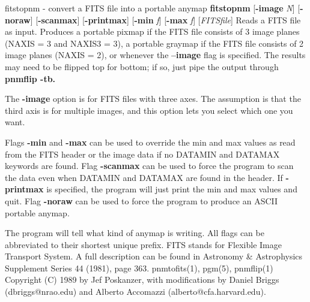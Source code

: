 fitstopnm - convert a FITS file into a portable anymap
{\bf fitstopnm}
{\rm [}{\bf -image}
{\it N}{\rm ]}
{\rm [}{\bf -noraw}{\rm ]}
{\rm [}{\bf -scanmax}{\rm ]}
{\rm [}{\bf -printmax}{\rm ]}
{\rm [}{\bf -min}
{\it f}{\rm ]}
{\rm [}{\bf -max}
{\it f}{\rm ]}
{\rm [}{\it FITSfile}{\rm ]}
Reads a FITS file as input.
Produces a portable pixmap if the FITS file consists of 3 image planes
(NAXIS = 3 and NAXIS3 = 3), a portable graymap if the FITS file
consists of 2 image planes (NAXIS = 2), or whenever the 
{\bf --image}
flag is specified.
The results may need to be flipped top for bottom; if so, just
pipe the output through
{\bf pnmflip -tb.}
\par
The
{\bf -image}
option is for FITS files with three axes.
The assumption is that the third axis is for multiple images,
and this option lets you select which one you want.
\par
Flags 
{\bf -min}
and 
{\bf -max}
can be used to override the min and max values as read from the FITS
header or the image data if no DATAMIN and DATAMAX keywords are found.
Flag
{\bf -scanmax}
can be used to force the program to scan the data even when DATAMIN
and DATAMAX are found in the header. If 
{\bf -printmax}
is specified, the program will just print the min and max values and
quit.
Flag
{\bf -noraw}
can be used to force 
the program to produce an ASCII portable anymap.
\par
The program will tell what kind of anymap is writing.
All flags can be abbreviated to their shortest unique prefix.
FITS stands for Flexible Image Transport System.  A full description
can be found in Astronomy \& Astrophysics Supplement Series 44 (1981),
page 363.
pnmtofits(1), pgm(5), pnmflip(1)
Copyright (C) 1989 by Jef Poskanzer, with modifications by 
Daniel Briggs (dbriggs@nrao.edu) and Alberto
Accomazzi (alberto@cfa.harvard.edu).
%

%


